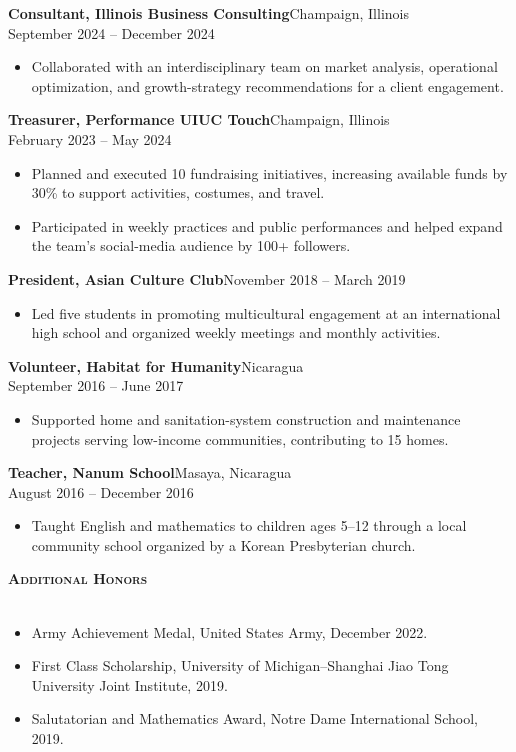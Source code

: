\documentclass[a4paper]{article}
\newcommand{\lineunder}{
    \vspace*{-8pt} \\
    \hspace*{-18pt} \hrulefill \\
}
\newcommand{\header}[1]{
    \Needspace{4\baselineskip}
    {\hspace*{-18pt}\vspace*{6pt} \textsc{#1}}
    \vspace*{-6pt} \lineunder
}
\begin{document}
\textbf{Consultant, Illinois Business Consulting}\hfill Champaign, Illinois\\
September 2024 -- December 2024
\begin{itemize}[noitemsep]
  \item Collaborated with an interdisciplinary team on market analysis, operational optimization, and growth-strategy recommendations for a client engagement.
\end{itemize}

\textbf{Treasurer, Performance UIUC Touch}\hfill Champaign, Illinois\\
February 2023 -- May 2024
\begin{itemize}[noitemsep]
  \item Planned and executed 10 fundraising initiatives, increasing available funds by 30\% to support activities, costumes, and travel.
  \item Participated in weekly practices and public performances and helped expand the team's social-media audience by 100+ followers.
\end{itemize}

\textbf{President, Asian Culture Club}\hfill November 2018 -- March 2019
\begin{itemize}[noitemsep]
  \item Led five students in promoting multicultural engagement at an international high school and organized weekly meetings and monthly activities.
\end{itemize}

\textbf{Volunteer, Habitat for Humanity}\hfill Nicaragua\\
September 2016 -- June 2017
\begin{itemize}[noitemsep]
  \item Supported home and sanitation-system construction and maintenance projects serving low-income communities, contributing to 15 homes.
\end{itemize}

\textbf{Teacher, Nanum School}\hfill Masaya, Nicaragua\\
August 2016 -- December 2016
\begin{itemize}[noitemsep]
  \item Taught English and mathematics to children ages 5--12 through a local community school organized by a Korean Presbyterian church.
\end{itemize}

\vspace*{1mm}
\header{\textbf{Additional Honors}}
\begin{itemize}[noitemsep]
  \item Army Achievement Medal, United States Army, December 2022.
  \item First Class Scholarship, University of Michigan--Shanghai Jiao Tong University Joint Institute, 2019.
  \item Salutatorian and Mathematics Award, Notre Dame International School, 2019.
\end{itemize}
\end{document}
